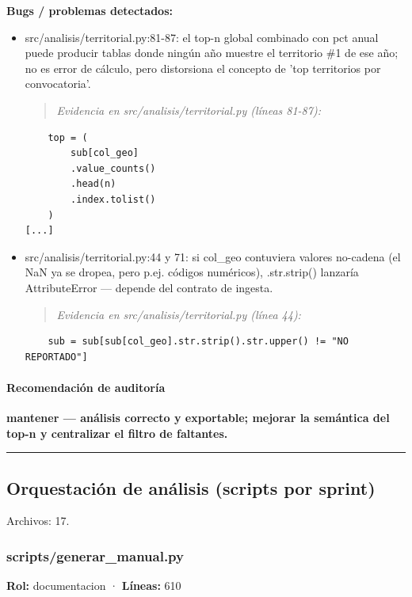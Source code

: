 \begin{tcolorbox}[riesgo]
\textbf{Bugs / problemas detectados:}
\begin{itemize}
  \item src/analisis/territorial.py:81-87: el top-n global combinado con pct anual puede producir tablas donde ningún año muestre el territorio \#1 de ese año; no es error de cálculo, pero distorsiona el concepto de 'top territorios por convocatoria'.
\begin{quote}\footnotesize\ttfamily
\noindent\emph{Evidencia en src/analisis/territorial.py (líneas 81-87):}
\end{quote}
\begin{lstlisting}
    top = (
        sub[col_geo]
        .value_counts()
        .head(n)
        .index.tolist()
    )
[...]
\end{lstlisting}

  \item src/analisis/territorial.py:44 y 71: si col\_geo contuviera valores no-cadena (el NaN ya se dropea, pero p.ej. códigos numéricos), .str.strip() lanzaría AttributeError --- depende del contrato de ingesta.
\begin{quote}\footnotesize\ttfamily
\noindent\emph{Evidencia en src/analisis/territorial.py (línea 44):}
\end{quote}
\begin{lstlisting}
    sub = sub[sub[col_geo].str.strip().str.upper() != "NO REPORTADO"]
\end{lstlisting}

\end{itemize}
\end{tcolorbox}

\paragraph{Recomendación de auditoría}
\textbf{mantener --- análisis correcto y exportable; mejorar la semántica del top-n y centralizar el filtro de faltantes.}

\medskip
\hrule

\subsection{Orquestación de análisis (scripts por sprint)}
\noindent Archivos: 17.

\subsubsection{scripts/generar\_manual.py}
\textbf{Rol:} documentacion · \textbf{Líneas:} 610


